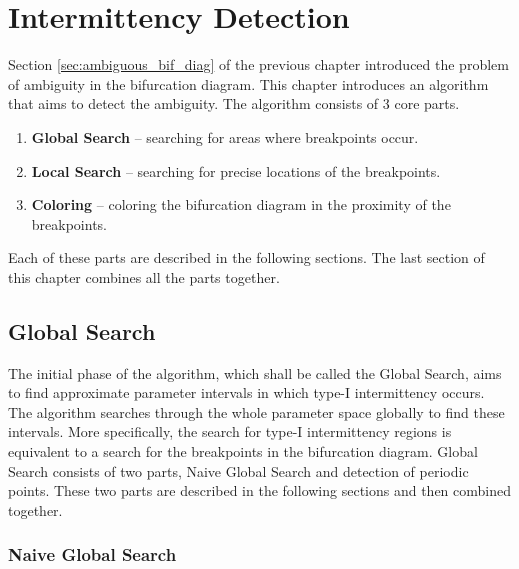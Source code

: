 \chapter{Intermittency Detection}
\label{chapter:intdetection}
Section \ref{sec:ambiguous_bif_diag} of the previous chapter introduced the problem of ambiguity in the bifurcation diagram.
This chapter introduces an algorithm that aims to detect the ambiguity.
The algorithm consists of 3 core parts.

\begin{enumerate}
	\item \textbf{Global Search} -- searching for areas where breakpoints occur.
	\item \textbf{Local Search} -- searching for precise locations of the breakpoints.
	\item \textbf{Coloring} -- coloring the bifurcation diagram in the proximity of the breakpoints.
\end{enumerate}

Each of these parts are described in the following sections.
The last section of this chapter combines all the parts together.

\section{Global Search}
\label{sec:globsearch}
The initial phase of the algorithm, which shall be called the Global Search, aims to find approximate parameter intervals in which type-I intermittency occurs.
The algorithm searches through the whole parameter space globally to find these intervals.
More specifically, the search for type-I intermittency regions is equivalent to a search for the breakpoints in the bifurcation diagram.
Global Search consists of two parts, Naive Global Search and detection of periodic points.
These two parts are described in the following sections and then combined together.
\subsection{Naive Global Search}

